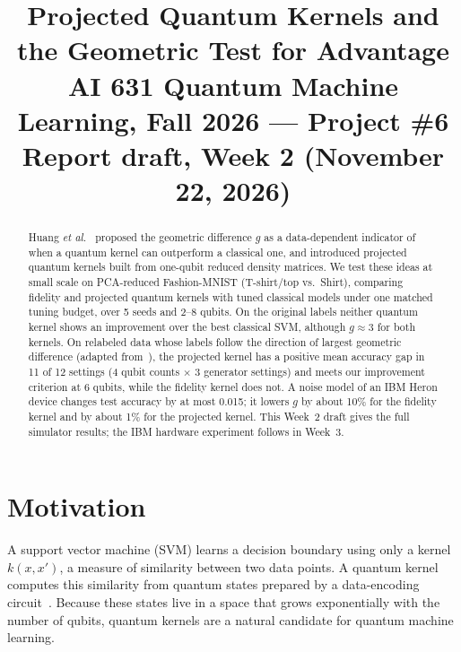 \documentclass[conference]{IEEEtran}
\begin{document}
\title{Projected Quantum Kernels and the Geometric Test for Advantage\\
\large AI 631 Quantum Machine Learning, Fall 2026 --- Project \#6\\
Report draft, Week 2 (November 22, 2026)}

\author{
}

\maketitle

\begin{abstract}
Huang \textit{et al.}~\cite{huang2021} proposed the geometric difference $g$ as a data-dependent indicator of when a quantum kernel can outperform a classical one, and introduced projected quantum kernels built from one-qubit reduced density matrices. We test these ideas at small scale on PCA-reduced Fashion-MNIST (T-shirt/top vs.\ Shirt), comparing fidelity and projected quantum kernels with tuned classical models under one matched tuning budget, over 5 seeds and 2--8 qubits. On the original labels neither quantum kernel shows an improvement over the best classical SVM, although $g\approx3$ for both kernels. On relabeled data whose labels follow the direction of largest geometric difference (adapted from~\cite{huang2021}), the projected kernel has a positive mean accuracy gap in 11 of 12 settings (4 qubit counts $\times$ 3 generator settings) and meets our improvement criterion at 6 qubits, while the fidelity kernel does not. A noise model of an IBM Heron device changes test accuracy by at most 0.015; it lowers $g$ by about 10\% for the fidelity kernel and by about 1\% for the projected kernel. This Week~2 draft gives the full simulator results; the IBM hardware experiment follows in Week~3.
\end{abstract}

\section{Motivation}
A support vector machine (SVM) learns a decision boundary using only a kernel $k(x,x')$, a measure of similarity between two data points. A quantum kernel computes this similarity from quantum states prepared by a data-encoding circuit~\cite{schuld2019,havlicek2019}. Because these states live in a space that grows exponentially with the number of qubits, quantum kernels are a natural candidate for quantum machine learning.
\end{document}
